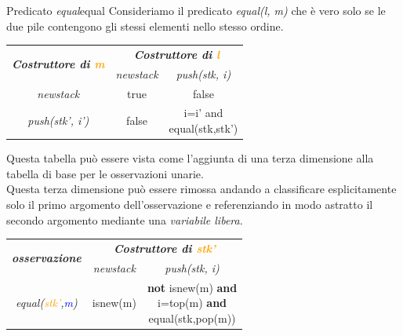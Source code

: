 \documentclass[12pt]{report}
\newcommand{\nmu}{}
\begin{document}
 	\begin{example}{\nmu Predicato \textit{equal}}{equal}
 		Consideriamo il predicato \textit{equal(l, m)} che è vero solo se le due pile contengono gli stessi elementi nello stesso ordine.
 		\begin{center}
 			\begin{tabular}{|c|c|c|}
 				\hline
 				\multirow{2}{*}{\textbf{\textit{Costruttore di \textcolor{orange}{m}}}} & \multicolumn{2}{c|}{\textbf{\textit{Costruttore di \textcolor{orange}{l}}}} \\ \cline{2-3}
 				& \textit{newstack} & \textit{push(stk, i)} \\ \hline
 				\textit{newstack}                                                        & true              & false                 \\ \hline
 				\textit{push(stk', i')}                                                  & false             & \makecell{i=i' and \\ equal(stk,stk')} \\ \hline
 			\end{tabular}
 		\end{center}
 		Questa tabella può essere vista come l'aggiunta di una terza dimensione alla tabella di base per le osservazioni unarie. \\
 		Questa terza dimensione può essere rimossa andando a classificare esplicitamente solo il primo argomento dell'osservazione e referenziando in modo astratto il secondo argomento mediante una \textit{variabile libera}.
 		\begin{center}
 			\begin{tabular}{|c|c|c|}
 				\hline
 				\multirow{2}{*}{\textbf{\textit{osservazione}}} & \multicolumn{2}{c|}{\textbf{\textit{Costruttore di \textcolor{orange}{stk'}}}} \\ \cline{2-3}
 				& \textit{newstack} & \textit{push(stk, i)} \\ \hline
 				\textit{equal(\textcolor{orange}{stk'},\textcolor{blue}{m})} & isnew(m) & \makecell{\textbf{not} isnew(m) \textbf{and} \\ i=top(m) \textbf{and} \\ equal(stk,pop(m))} \\ \hline
 			\end{tabular}
 		\end{center}
 	\end{example}
\end{document}
